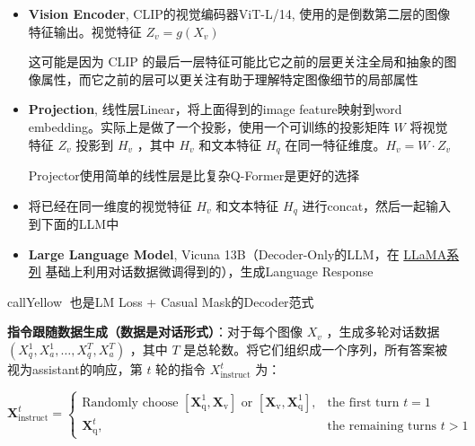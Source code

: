 \documentclass[zihao=false,fontset=windows]{ctexart}
\newcommand{\bigmath}[1]{%
  \begin{center}\large$\displaystyle #1$\end{center}%
}
\newcommand{\hly}[1]{\colorbox{hlYellow}{#1}}
\begin{document}
\begin{itemize}
\item \hly{\textcolor{feishuRed}{\textbf{Vision Encoder}}}, CLIP的视觉编码器ViT-L/14, 使用的是倒数第二层的图像特征输出。视觉特征 $Z_v=g(X_v)$
\begin{feishuquote}
这可能是因为 CLIP 的最后一层特征可能比它之前的层更关注全局和抽象的图像属性，而它之前的层可以更关注有助于理解特定图像细节的局部属性\par
\end{feishuquote}
\item \hly{\textcolor{feishuRed}{\textbf{Projection}}}, 线性层Linear，将上面得到的image feature映射到word embedding。实际上是做了一个投影，使用一个可训练的投影矩阵 $W$ 将视觉特征 $Z_v$ 投影到 $H_v$ ，其中 $H_v$ 和文本特征 $H_q$ 在同一特征维度。$H_v=W \cdot Z_v$
\begin{feishuquote}
\textcolor{feishuRed}{Projector使用简单的线性层是比复杂Q-Former是更好的选择}\par
\end{feishuquote}
\item 将已经在同一维度的视觉特征 $H_v$ 和文本特征 $H_q$ 进行concat，然后一起输入到下面的LLM中
\item \hly{\textcolor{feishuRed}{\textbf{Large Language Model}}}, Vicuna 13B（Decoder-Only的LLM，在 \href{https://swfvqxo30ma.feishu.cn/wiki/Y0TEw0IL1iPHNbkFRbBczAy5nUg}{LLaMA系列} 基础上利用对话数据微调得到的），生成Language Response
\end{itemize}

\par\vspace{1.15em}\par\vspace{0.28em}

\begin{feishubox}{callYellow}{🌟}
也是LM Loss + Casual Mask的Decoder范式\par
\end{feishubox}

\textbf{指令跟随数据生成（数据是对话形式）}：对于每个图像 $X_v$ ，生成多轮对话数据 $(X^1_q,X^1_a,\ldots,X^T_q,X^T_a)$ ，其中 $T$ 是总轮数。将它们组织成一个序列，所有答案被视为assistant的响应，第 $t$ 轮的指令 $X^t_{\mathrm{instruct}}$ 为：\par

\bigmath{\mathbf{X}_{\mathrm{instruct}}^{t}=\begin{cases}\text{Randomly choose }[\mathbf{X}_{\mathrm{q}}^{1},\mathbf{X}_{\mathrm{v}}]\text{ or }[\mathbf{X}_{\mathrm{v}},\mathbf{X}_{\mathrm{q}}^{1}], & \text{the first turn }t=1\\ \mathbf{X}_{\mathrm{q}}^{t}, & \text{the remaining turns }t>1\end{cases}}
\end{document}
